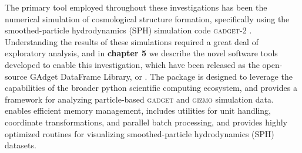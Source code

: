 \documentclass[../thesis.tex]{subfiles}
\begin{document}
The primary tool employed throughout these investigations has been the numerical simulation of cosmological structure formation, specifically using the smoothed-particle hydrodynamics (SPH) simulation code \textsc{gadget-2} \citep{Springel2005}.  
Understanding the results of these simulations required a great deal of exploratory analysis, and in \textbf{chapter 5} we describe the novel software tools developed to enable this investigation, which have been released as the open-source GAdget DataFrame Library, or . The package is designed to leverage the capabilities of the broader python scientific computing ecosystem, and provides a framework for analyzing particle-based \textsc{gadget} and \textsc{gizmo} \citep{Hopkins2015} simulation data.   enables  efficient memory management, includes utilities for unit handling, coordinate transformations, and parallel batch processing, and provides highly optimized routines for visualizing smoothed-particle hydrodynamics (SPH) datasets.
\end{document}

